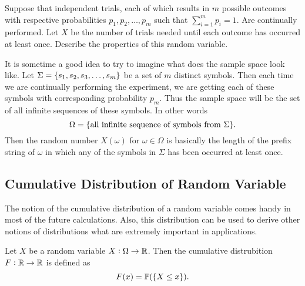 \begin{example}
	Suppose that independent trials, each of which results in $m$ possible outcomes with respective probabilities $p_1, p_2, \hdots,p_m$ such that $\sum_{i=1}^{m}p_i = 1$. Are continually performed. Let $X$ be the number of trials needed until each outcome has occurred at least once. Describe the properties of this random variable.
	\begin{solution}
		It is sometime a good idea to try to imagine what does the sample space look like. Let $\Sigma=\{s_1, s_2, s_3, \hdots, s_m\}$ be a set of $m$ distinct symbols. Then each time we are continually performing the experiment, we are getting each of these symbols with corresponding probability $p_m$. Thus the sample space will be the set of all infinite sequences of these symbols. In other words
		\[ \Omega = \{\text{all infinite sequence of symbols from $\Sigma$}\}. \]
		Then the random number $X(\omega)$ for $\omega \in \Omega$ is basically the length of the prefix string of $\omega$ in which any of the symbols in $\Sigma$ has been occurred at least once. 
	\end{solution}
\end{example}

\subsection{Cumulative Distribution of Random Variable}
The notion of the cumulative distribution of a random variable comes handy in most of the future calculations. Also, this distribution can be used to derive other notions of distributions what are extremely important in applications. 

\begin{definition}
	Let $X$ be a random variable $X:\Omega \to \mathbb{R}$. Then the cumulative distrubition $F: \mathbb{R} \to \mathbb{R}$ is defined as
	\[ F(x) = \mathbb{P}(\{X \leq x\}).  \]
\end{definition}


